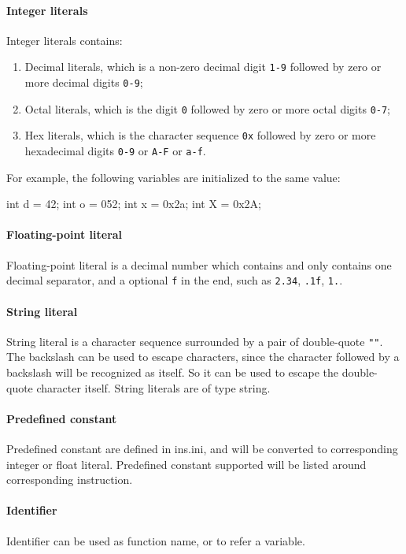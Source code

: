 \documentclass{article}
\begin{document}
\paragraph{Integer literals} Integer literals contains:

\begin{enumerate}
	\item Decimal literals, which is a non-zero decimal digit \verb|1-9| followed by zero or more decimal digits \verb|0-9|;
	\item Octal literals, which is the digit \verb|0| followed by zero or more octal digits \verb|0-7|;
	\item Hex literals, which is the character sequence \verb|0x| followed by zero or more hexadecimal digits \verb|0-9| or \verb|A-F| or \verb|a-f|.
\end{enumerate}

For example, the following variables are initialized to the same value:

\begin{MUAvbt}
int d = 42;
int o = 052;
int x = 0x2a;
int X = 0x2A;
\end{MUAvbt}

\paragraph{Floating-point literal} Floating-point literal is a decimal number which contains and only contains one decimal separator, and a optional \verb|f| in the end, such as \verb|2.34|, \verb|.1f|, \verb|1.|.

\paragraph{String literal} String literal is a character sequence surrounded by a pair of double-quote \verb|""|. The backslash can be used to escape characters, since the character followed by a backslash will be recognized as itself. So it can be used to escape the double-quote character itself. String literals are of type string.

\paragraph{Predefined constant} Predefined constant are defined in ins.ini, and will be converted to corresponding integer or float literal. Predefined constant supported will be listed around corresponding instruction.

\paragraph{Identifier} Identifier can be used as function name, or to refer a variable.%
\end{document}
